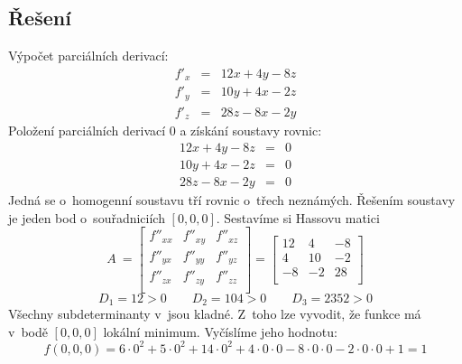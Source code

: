 \subsection*{Řešení}
Výpočet parciálních derivací:
\begin{eqnarray}
f'_x  & = & 12x + 4y - 8z \nonumber \\
f'_y  & = & 10y + 4x - 2z \nonumber \\
f'_z  & = & 28z - 8x - 2y \nonumber
\end{eqnarray}
\noindent Položení parciálních derivací $0$ a získání soustavy rovnic:
\begin{eqnarray}
12x + 4y - 8z & = & 0\nonumber \\
10y + 4x - 2z & = & 0\nonumber \\
28z - 8x - 2y & = & 0\nonumber
\end{eqnarray}
Jedná se o~homogenní soustavu tří rovnic o~třech neznámých. Řešením soustavy je jeden bod o~souřadniciích $[0,0,0]$. Sestavíme si Hassovu matici
\begin{displaymath}
A~= \begin{bmatrix}
f''_{xx} & f''_{xy} &  f''_{xz}\\
f''_{yx} & f''_{yy} &  f''_{yz}\\
f''_{zx} & f''_{zy} &  f''_{zz}\\
\end{bmatrix}
=
\begin{bmatrix}
12 & 4 & -8\\
4 & 10 & -2\\
-8 & -2 & 28\\
\end{bmatrix}
\end{displaymath}
\begin{displaymath}
D_1 = 12 > 0 \qquad D_2 = 104 > 0 \qquad D_3 = 2352 > 0
\end{displaymath}
Všechny subdeterminanty v~jsou kladné. Z~toho lze vyvodit, že funkce má v~bodě $[0, 0, 0]$ lokální minimum. Vyčíslíme jeho hodnotu:
\begin{displaymath}
f(0,0,0) = 6\cdot0^2 + 5\cdot0^2 + 14\cdot0^2 + 4\cdot0\cdot0 - 8\cdot0\cdot0 - 2\cdot0\cdot0 + 1 = 1
\end{displaymath}

